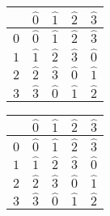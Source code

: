 \documentclass{article}
\newcommand{\pluscurvedarrow}{%
		\begin{tikzpicture}[inner sep=0pt]
			\useasboundingbox (-0.5em,0) rectangle (0em,0);
			\draw[->] (210:0.20cm) arc (210:60:0.20cm) node[above left=0.125cm,pos=0.5] {$\scriptscriptstyle+$};
		\end{tikzpicture}%
	}
\newcommand{\curvedarrowplus}{%
		\begin{tikzpicture}[inner sep=0pt,baseline=-0.25em]
			\useasboundingbox (-0.25em,0) rectangle (0.25em,0);
			\node at (0,0) {$+$};
			\draw[->] (210:0.20cm) arc (210:60:0.20cm);
		\end{tikzpicture}
	}
\begin{document}
\renewcommand*\arraystretch{1.3}
\begin{tabular}{|c|c|c|c|c|}
	\cline{2-5}
	\multicolumn{1}{c|}{\curvedarrowplus} & $\hat{0}$ & $\hat{1}$ & $\hat{2}$ & $\hat{3}$ \\
	\hline
	$\hat{0}$                             & $\hat{0}$ & $\hat{1}$ & $\hat{2}$ & $\hat{3}$ \\
	\hline
	$\hat{1}$                             & $\hat{1}$ & $\hat{2}$ & $\hat{3}$ & $\hat{0}$ \\
	\hline
	$\hat{2}$                             & $\hat{2}$ & $\hat{3}$ & $\hat{0}$ & $\hat{1}$ \\
	\hline
	$\hat{3}$                             & $\hat{3}$ & $\hat{0}$ & $\hat{1}$ & $\hat{2}$ \\
	\hline
\end{tabular}

\bigbreak

\begin{tabular}{|c|c|c|c|c|}
	\cline{2-5}
	\multicolumn{1}{c|}{\pluscurvedarrow} & $\hat{0}$ & $\hat{1}$ & $\hat{2}$ & $\hat{3}$ \\
	\hline
	$\hat{0}$                             & $\hat{0}$ & $\hat{1}$ & $\hat{2}$ & $\hat{3}$ \\
	\hline
	$\hat{1}$                             & $\hat{1}$ & $\hat{2}$ & $\hat{3}$ & $\hat{0}$ \\
	\hline
	$\hat{2}$                             & $\hat{2}$ & $\hat{3}$ & $\hat{0}$ & $\hat{1}$ \\
	\hline
	$\hat{3}$                             & $\hat{3}$ & $\hat{0}$ & $\hat{1}$ & $\hat{2}$ \\
	\hline
\end{tabular}
\end{document}
